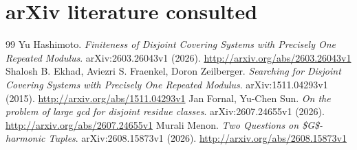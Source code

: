 \documentclass[11pt,a4paper]{article}
\begin{document}
\section{arXiv literature consulted}
\begin{thebibliography}{99}
 Yu Hashimoto. \emph{Finiteness of Disjoint Covering Systems with Precisely One Repeated Modulus}. arXiv:2603.26043v1 (2026). \url{http://arxiv.org/abs/2603.26043v1}
 Shalosh B. Ekhad, Aviezri S. Fraenkel, Doron Zeilberger. \emph{Searching for Disjoint Covering Systems with Precisely One Repeated Modulus}. arXiv:1511.04293v1 (2015). \url{http://arxiv.org/abs/1511.04293v1}
 Jan Fornal, Yu-Chen Sun. \emph{On the problem of large gcd for disjoint residue classes}. arXiv:2607.24655v1 (2026). \url{http://arxiv.org/abs/2607.24655v1}
 Murali Menon. \emph{Two Questions on \$G\$-harmonic Tuples}. arXiv:2608.15873v1 (2026). \url{http://arxiv.org/abs/2608.15873v1}
\end{thebibliography}
\end{document}
